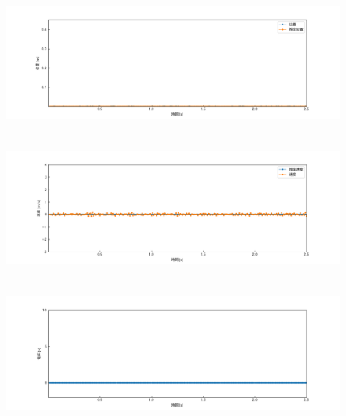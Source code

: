 \documentclass[12pt]{jsarticle}
\begin{document}
\begin{figure}[H]
  \begin{center}
    \includegraphics[clip,width=13.0cm, height=4.4cm]{../img/Exp8-1.png}
    \caption{}
    \label{Exp8-1}
  \end{center}
\end{figure}
\begin{figure}[H]
  \begin{center}
    \includegraphics[clip,width=13.0cm, height=4.4cm]{../img/Exp8-2.png}
    \caption{}
    \label{Exp8-2}
  \end{center}
\end{figure}
\begin{figure}[H]
  \begin{center}
    \includegraphics[clip,width=13.0cm, height=4.4cm]{../img/Exp8-3.png}
    \caption{}
    \label{Exp8-3}
  \end{center}
\end{figure}
\end{document}
